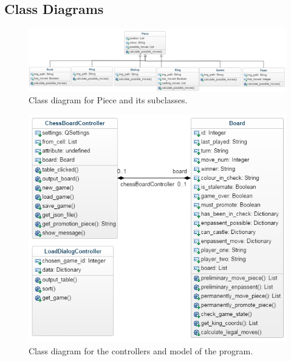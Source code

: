 \documentclass[twoside, 12pt]{report}
\begin{document}
\subsection{Class Diagrams}
\begin{figure}[H]
\centering
	\includegraphics[width=1.0\textwidth]{images/class-diagrams/pieces}
	\caption{Class diagram for Piece and its subclasses.}
\end{figure}
\begin{figure}[H]
\centering
	\includegraphics[width=1.0\textwidth]{images/class-diagrams/board}
	\caption{Class diagram for the controllers and model of the program.}
\end{figure}
\end{document}
